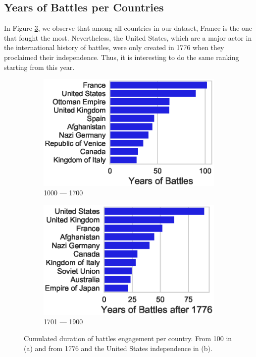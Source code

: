 \subsection{Years of Battles per Countries}
In Figure \ref{fig:FightingDurationRanking}, we observe that among all countries in our dataset, France is the one that fought the most. Nevertheless, the United States, which are a major actor in the international history of battles, were only created in 1776 when they proclaimed their independence. Thus, it is interesting to do the same ranking starting from this year. 
 \begin{figure}[h]
 	\centering
 	\begin{subfigure}[b]{0.475\linewidth}
 		\centering
 		\includegraphics[width=\linewidth]{figures/YearsFightingRanking.eps}
 		\caption[]%
 		{{\small 1000 --- 1700}}    
 		\label{fig:FightingDurationRankingOld}
 	\end{subfigure}
 	\begin{subfigure}[b]{0.475\linewidth}  
 		\centering 
 		\includegraphics[width=\linewidth]{figures/YearsFightingRankingModern}
 		\caption[]%
 		{{\small 1701 --- 1900}}    
 		\label{fig:FightingDurationRankingModern}
 	\end{subfigure}
 	\baselineskip
	\caption{Cumulated duration of battles engagement per country. From 100 in (a) and from 1776 and the United States independence in (b).} 
 	\label{fig:FightingDurationRanking}
 \end{figure}
 
